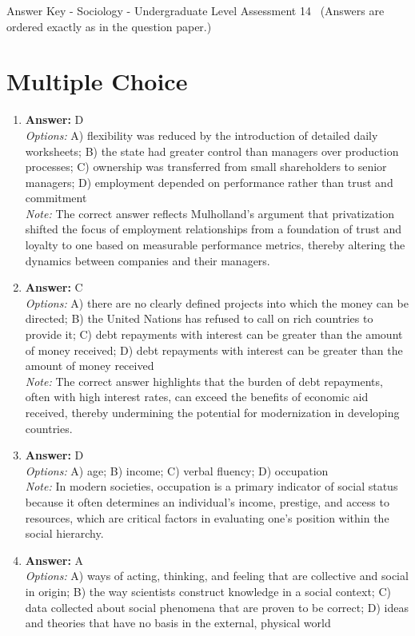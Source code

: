 \documentclass[12pt]{article}
\begin{document}
\begin{center}
Answer Key - Sociology - Undergraduate Level Assessment 14 \
\small (Answers are ordered exactly as in the question paper.)
\end{center}

\section*{Multiple Choice}
\begin{enumerate}[label=\arabic*.]
\item \textbf{Answer:} D
\\ \textit{Options:} A) flexibility was reduced by the introduction of detailed daily worksheets; B) the state had greater control than managers over production processes; C) ownership was transferred from small shareholders to senior managers; D) employment depended on performance rather than trust and commitment
\\ \textit{Note:} The correct answer reflects Mulholland's argument that privatization shifted the focus of employment relationships from a foundation of trust and loyalty to one based on measurable performance metrics, thereby altering the dynamics between companies and their managers.
\item \textbf{Answer:} C
\\ \textit{Options:} A) there are no clearly defined projects into which the money can be directed; B) the United Nations has refused to call on rich countries to provide it; C) debt repayments with interest can be greater than the amount of money received; D) debt repayments with interest can be greater than the amount of money received
\\ \textit{Note:} The correct answer highlights that the burden of debt repayments, often with high interest rates, can exceed the benefits of economic aid received, thereby undermining the potential for modernization in developing countries.
\item \textbf{Answer:} D
\\ \textit{Options:} A) age; B) income; C) verbal fluency; D) occupation
\\ \textit{Note:} In modern societies, occupation is a primary indicator of social status because it often determines an individual's income, prestige, and access to resources, which are critical factors in evaluating one's position within the social hierarchy.
\item \textbf{Answer:} A
\\ \textit{Options:} A) ways of acting, thinking, and feeling that are collective and social in origin; B) the way scientists construct knowledge in a social context; C) data collected about social phenomena that are proven to be correct; D) ideas and theories that have no basis in the external, physical world

\end{enumerate}
\end{document}
